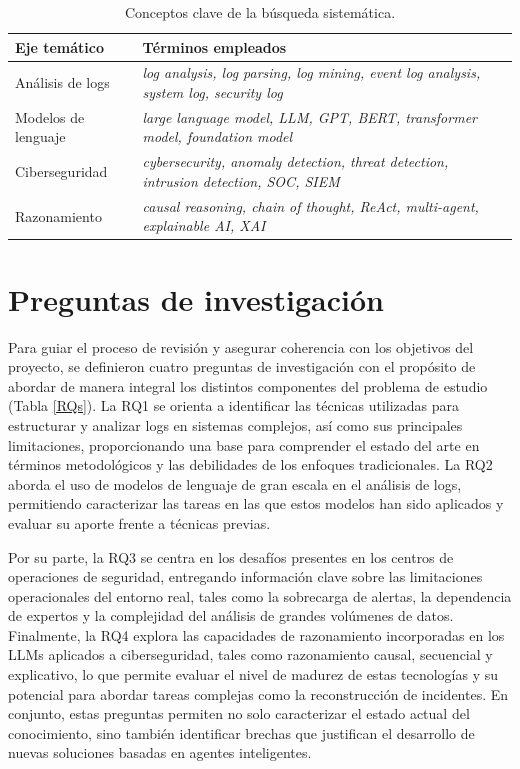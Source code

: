 \begin{table}[H]
\centering
\renewcommand{\arraystretch}{1.2}
\caption{Conceptos clave de la búsqueda sistemática.}
\renewcommand{\tablename}{Table}
\setlength{\arrayrulewidth}{1pt}
\begin{tabularx}{0.9\textwidth}{@{} l X @{}}
\toprule
\hline
\textbf{Eje temático} & \textbf{Términos empleados} \\
\hline
\midrule
Análisis de logs & \textsl{log analysis, log parsing, log mining, event log analysis, system log, security log} \\
\hline
Modelos de lenguaje & \textsl{large language model, LLM, GPT, BERT, transformer model, foundation model} \\
\hline
Ciberseguridad & \textsl{cybersecurity, anomaly detection, threat detection, intrusion detection, SOC, SIEM} \\
\hline
Razonamiento & \textsl{causal reasoning, chain of thought, ReAct, multi-agent, explainable AI, XAI} \\
\bottomrule
\hline
\end{tabularx}
\label{tab:conceptos_clave}
\end{table}

\section{Preguntas de investigación}

Para guiar el proceso de revisión y asegurar coherencia con los objetivos del proyecto, se definieron cuatro preguntas de investigación con el propósito de abordar de manera integral los distintos componentes del problema de estudio (Tabla \ref{RQs}). La RQ1 se orienta a identificar las técnicas utilizadas para estructurar y analizar logs en sistemas complejos, así como sus principales limitaciones, proporcionando una base para comprender el estado del arte en términos metodológicos y las debilidades de los enfoques tradicionales. La RQ2 aborda el uso de modelos de lenguaje de gran escala en el análisis de logs, permitiendo caracterizar las tareas en las que estos modelos han sido aplicados y evaluar su aporte frente a técnicas previas.

Por su parte, la RQ3 se centra en los desafíos presentes en los centros de operaciones de seguridad, entregando información clave sobre las limitaciones operacionales del entorno real, tales como la sobrecarga de alertas, la dependencia de expertos y la complejidad del análisis de grandes volúmenes de datos. Finalmente, la RQ4 explora las capacidades de razonamiento incorporadas en los LLMs aplicados a ciberseguridad, tales como razonamiento causal, secuencial y explicativo, lo que permite evaluar el nivel de madurez de estas tecnologías y su potencial para abordar tareas complejas como la reconstrucción de incidentes. En conjunto, estas preguntas permiten no solo caracterizar el estado actual del conocimiento, sino también identificar brechas que justifican el desarrollo de nuevas soluciones basadas en agentes inteligentes.


